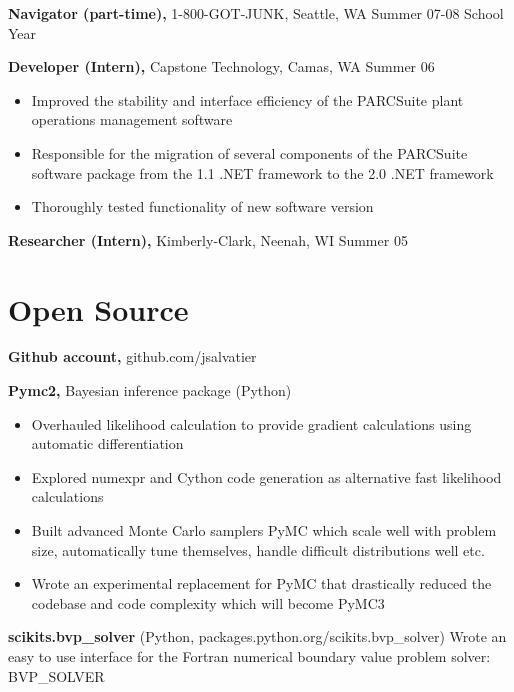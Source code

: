 \documentclass[margin]{res}
\begin{document}
\begin{resume}
  {\bf Navigator (part-time),} 1-800-GOT-JUNK, Seattle, WA \hfill  Summer 07-08 School Year

  {\bf Developer (Intern),} Capstone Technology, Camas, WA \hfill  Summer 06
  \begin{itemize} \itemsep -2pt
    \item Improved the stability and interface efficiency of the PARCSuite plant operations management software 
    \item Responsible for the migration of several components of the PARCSuite software package from the 1.1 .NET framework to the 2.0 .NET framework 
    \item Thoroughly tested functionality of new software version 
   \end{itemize}

  {\bf Researcher (Intern),} Kimberly-Clark, Neenah, WI \hfill  Summer 05

\section{Open Source}
  {\bf Github account,} github.com/jsalvatier 

  {\bf Pymc2,} Bayesian inference package (Python) 
  \begin{itemize} \itemsep -2pt
    \item Overhauled likelihood calculation to provide gradient calculations using automatic differentiation
    \item Explored numexpr and Cython code generation as alternative fast likelihood calculations
    \item Built advanced Monte Carlo samplers PyMC which scale well with problem size, automatically tune themselves, handle difficult distributions well etc.
    \item Wrote an experimental replacement for PyMC that drastically reduced the codebase and code complexity which will become PyMC3
   \end{itemize}

  {\bf scikits.bvp_solver} (Python, packages.python.org/scikits.bvp_solver) 
    Wrote an easy to use interface for the Fortran numerical boundary value problem solver: BVP_SOLVER 
  

\end{resume} 
\end{document}
